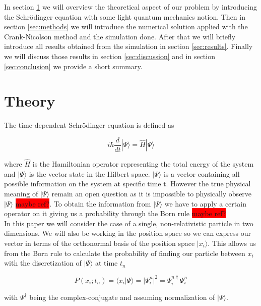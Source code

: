 \documentclass[english,notitlepage,reprint,nofootinbib]{revtex4-2}  %
\begin{document}
	In section \ref{sec:theory} we will overview the theoretical aspect of our problem by introducing
	the Schrödinger equation with some light quantum mechanics notion. Then in section \ref{sec:methods}
	we will introduce the numerical solution applied with the Crank-Nicolson method and the simulation
	done. After that we will briefly introduce all results obtained from the simulation in section 
	\ref{sec:results}. Finally we will discuss those results in section \ref{sec:discussion} and
	in section  \ref{sec:conclusion} we provide a short summary. 
	
	
	\section{Theory} \label{sec:theory}
	The time-dependent Schrödinger equation is defined as
	
	\begin{equation}
	i \hbar \frac{d}{d t}|\Psi\rangle=\hat{H}|\Psi\rangle \label{eq:schro_eq}
	\end{equation}
	
	where $\hat{H}$ is the Hamiltonian operator representing the total energy of the system
	and $|\Psi\rangle$ is the vector state in the Hilbert space. $|\Psi\rangle$ is a vector 
	containing all possible information on the system at specific time t. However the true 
	physical meaning of $|\Psi\rangle$ remain an open question as it is impossible to 
	physically observe $|\Psi\rangle$ \colorbox{red}{maybe ref?}. To obtain the information
	from $|\Psi\rangle$ we have to apply a certain operator on it giving us a probability 
	through the Born rule \colorbox{red}{maybe ref?} \\

	
	In this paper we will consider the case of a single, non-relativistic particle in two dimensions.
	We will also be working in the position space so we can express our vector
	in terms of the orthonormal basis of the position space $|x_i\rangle$. This allows us 
	from the Born rule to calculate the probability of finding our particle between 
	$x_i$ with the discretization of  $|\Psi\rangle$  at time $t_n$
	
	\begin{equation}
		P(x_i;t_n) = \langle x_i |\Psi\rangle = |\Psi^n_i|^2 =  \Psi^{n\dagger}_i\Psi^n_i
	\end{equation}
	
	with $\Psi^\dagger$ being the complex-conjugate and assuming normalization of $
	|\Psi\rangle$. \\
	
\end{document}
